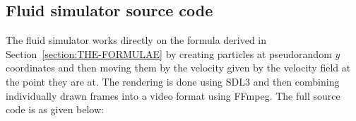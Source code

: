 \subsection{Fluid simulator source code}
The fluid simulator works directly on the formula derived in Section~\ref{section:THE-FORMULAE} by creating particles
at pseudorandom $y$ coordinates and then moving them by the velocity given by the velocity field at the point they are at.
The rendering is done using SDL3 and then combining individually drawn frames into a video format using FFmpeg. The full source
code is as given below:
